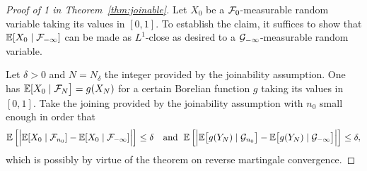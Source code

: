 \documentclass[12pt,a4paper]{article}
\begin{document}
\begin{proof}[Proof of 1 in Theorem~\ref{thm:joinable}]
Let $X_0$ be a $\mathcal{F}_0$-measurable random variable taking its values in $[0,1]$. 
To establish the claim, it suffices to show that 
$\mathbb{E}[X_{0} \mid \mathcal{F}_{-\infty}]$ can be made as $L^1$-close as desired to a 
$\mathcal{G}_{-\infty}$-measurable random variable. 

Let $\delta>0$ and $N = N_\delta$ the integer provided by the joinability assumption. 
One has 
$\mathbb{E}[X_0 \mid \mathcal{F}_{N}\bigr] = g(X_{N})$ 
for a certain Borelian function $g$ taking its values in $[0,1]$. 
Take the joining provided by the joinability assumption with 
$n_0$ small enough in order that 
$$
\mathbb{E}\left[ \Bigr| 
\mathbb{E}[X_0 \mid \mathcal{F}_{n_0}] - \mathbb{E}[X_0 \mid \mathcal{F}_{-\infty}] 
\Bigl| \right] 
\leq \delta
\quad \text{and }\; 
\mathbb{E}\left[ \Bigr| 
\mathbb{E}\bigl[g(Y_N) \mid \mathcal{G}_{n_0}\bigr] - \mathbb{E}\bigl[g(Y_N) \mid \mathcal{G}_{-\infty}\bigr]
\Bigl| \right] 
\leq \delta,
$$
which is possibly by virtue of the theorem on reverse martingale convergence. 


\end{proof}
\end{document}
